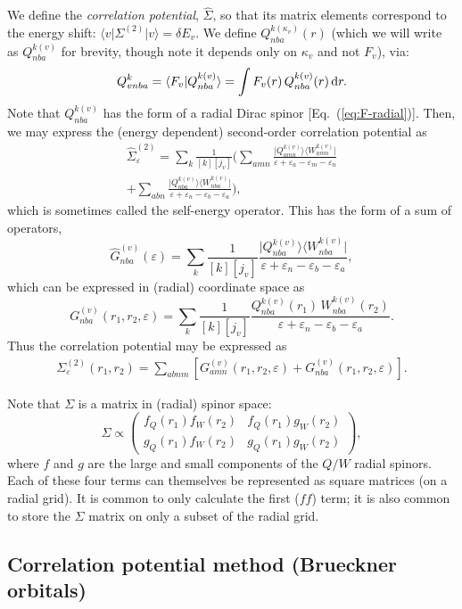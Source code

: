 \documentclass[10pt,twocolumn,a4paper]{article}%
\newcommand{\bra}[1]{\ensuremath{\langle #1|}}	%
\newcommand{\ket}[1]{\ensuremath{|#1\rangle}}	%
\newcommand{\braket}[1]{\ensuremath{\langle #1\rangle}}	%
\newcommand{\matr}[4]{\ensuremath{\begin{pmatrix}#1&#2\\#3&#4\end{pmatrix}}}	%
\newcommand{\be}{\begin{equation}}
\newcommand{\ee}{\end{equation}}
\def\d{\ensuremath{{\rm d}}}
\def\en{\ensuremath{\varepsilon}}
\begin{document}
We define the {\em correlation potential}, $\hat \Sigma$, so that its matrix elements correspond to the energy shift: $\bra{v}\Sigma^{(2)}\ket{v} = \delta E_v$.
We define
$Q^{k(\kappa_v)}_{nba}(r)$ (which we will write as $Q^{k(v)}_{nba}$ for brevity, though note it depends only on $\kappa_v$ and not $F_v$), via:
\be
Q^k_{vnba}
= \braket{F_v|Q^{k(v)}_{nba}}
= \int F_v(r) \, Q^{k(v)}_{nba}(r)\,\d r.
\ee
Note that $Q_{nba}^{k(v)}$ has the form of a radial Dirac spinor [Eq.~(\ref{eq:F-radial})].
Then, we may express the (energy dependent) second-order correlation potential as
\begin{multline}
\hat \Sigma^{(2)}_{\en} =
\sum_{k}\frac{1}{[k][j_v]}\Big(
\sum_{amn}\frac{\ket{Q^{k(v)}_{amn}}\bra{W^{k(v)}_{amn}}}
{\en + \en_a-\en_m-\en_n}\\
+
\sum_{abn}\frac{\ket{Q^{k(v)}_{nba}}\bra{W^{k(v)}_{nba}}}
{\en + \en_n-\en_b-\en_a}
\Big),
\end{multline}
which is sometimes called the self-energy operator.
This has the form of a sum of operators,
\be
\hat G^{(v)}_{nba}(\en) = \sum_{k}\frac{1}{[k][j_v]}\frac{\ket{Q^{k(v)}_{nba}}\bra{W^{k(v)}_{nba}}}
{\en+\en_n-\en_b-\en_a},
\ee
which can be expressed in (radial) coordinate space as
\be
G^{(v)}_{nba}(r_1,r_2,\en) = \sum_{k}\frac{1}{[k][j_v]}
\frac{Q^{k(v)}_{nba}(r_1)\, W^{k(v)}_{nba}(r_2)}
{\en + \en_n-\en_b-\en_a}.
\ee
Thus the correlation potential may be expressed as
\begin{multline}
\Sigma^{(2)}_{\en}(r_1,r_2) =
\sum_{abnm}\left[
G^{(v)}_{amn}(r_1,r_2,\en)
+
G^{(v)}_{nba}(r_1,r_2,\en)
\right].
\end{multline}

Note that $\Sigma$ is a matrix in (radial) spinor space:
\be
\Sigma \propto \matr{f_Q(r_1)f_W(r_2)}{f_Q(r_1)g_W(r_2)}{g_Q(r_1)f_W(r_2)}{g_Q(r_1)g_W(r_2)},
\ee
where $f$ and $g$ are the large and small components of the $Q/W$ radial spinors.
Each of these four terms can themselves be represented as square matrices (on a radial grid).
It is common to only calculate the first ($ff$) term; it is also common to store the $\Sigma$ matrix on only a subset of the radial grid.

\subsection{Correlation potential method (Brueckner orbitals)}
\end{document}
